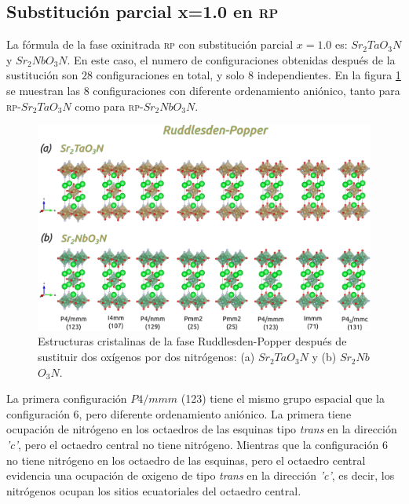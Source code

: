 \subsection{Substitución parcial x=1.0 en \textsc{rp}}

La fórmula de la fase oxinitrada \textsc{rp} con substitución parcial $x=1.0$ es: $Sr_{2}TaO_{3}N$ y  $Sr_{2}NbO_{3}N$. En este caso, el numero de configuraciones obtenidas después de la sustitución son $28$ configuraciones en total, y solo $8$ independientes. En la figura \ref{Fig. rp_1} se muestran las $8$ configuraciones con diferente ordenamiento aniónico, tanto para \textsc{rp}-$Sr_{2}TaO_{3}N$  como para \textsc{rp}-$Sr_{2}NbO_{3}N$.

\begin{figure}[H]
    \centering
    \includegraphics[width=\textwidth]{Figs/rp_1.png}
    \caption{Estructuras cristalinas de la fase Ruddlesden-Popper después de sustituir dos oxígenos por dos nitrógenos: (a) \textcolor{Sr}{$Sr_{2}$}\textcolor{Ta}{$Ta$}\textcolor{O}{$O_{3}$}\textcolor{N}{$N$} y (b) \textcolor{Sr}{$Sr_{2}$}\textcolor{Nb}{$Nb$}\textcolor{O}{$O_{3}$}\textcolor{N}{$N$}.}
    \label{Fig. rp_1}
\end{figure}

La primera configuración $P4/mmm$ (123) tiene el mismo grupo espacial que la configuración 6, pero diferente ordenamiento aniónico. La primera tiene ocupación de nitrógeno en los octaedros de las esquinas tipo \emph{trans} en la dirección \emph{'c'}, pero el octaedro central no tiene nitrógeno. Mientras que la configuración $6$ no tiene nitrógeno en los octaedro de las esquinas, pero el octaedro central evidencia una ocupación de oxigeno de tipo \emph{trans} en la dirección \emph{'c'}, es decir, los nitrógenos ocupan los sitios ecuatoriales del octaedro central.

